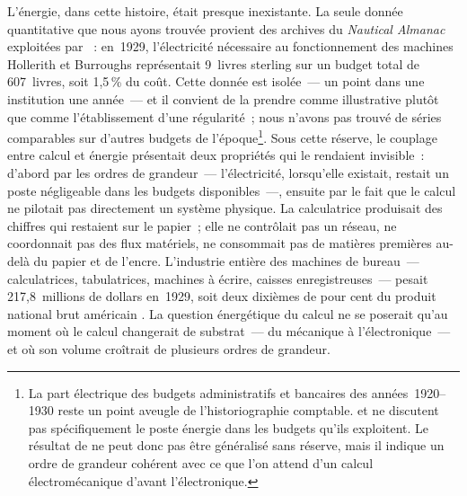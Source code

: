 L'énergie, dans cette histoire, était presque inexistante. La seule donnée quantitative que nous ayons trouvée provient des archives du \emph{Nautical Almanac} exploitées par \textcite{daston_calculation_2018}~: en~1929, l'électricité nécessaire au fonctionnement des machines Hollerith et Burroughs représentait 9~livres sterling sur un budget total de 607~livres, soit 1,5\,\% du coût. Cette donnée est isolée~--- un point dans une institution une année~--- et il convient de la prendre comme illustrative plutôt que comme l'établissement d'une régularité~; nous n'avons pas trouvé de séries comparables sur d'autres budgets de l'époque\footnote{La part électrique des budgets administratifs et bancaires des années~1920--1930 reste un point aveugle de l'historiographie comptable. \textcite{cortada_before_1993} et \textcite{wootton_making_2007} ne discutent pas spécifiquement le poste \og énergie\fg{} dans les budgets qu'ils exploitent. Le résultat de \textcite{daston_calculation_2018} ne peut donc pas être généralisé sans réserve, mais il indique un ordre de grandeur cohérent avec ce que l'on attend d'un calcul électromécanique d'avant l'électronique.}. %
Sous cette réserve, le couplage entre calcul et énergie présentait deux propriétés qui le rendaient invisible~: d'abord par les ordres de grandeur~--- l'électricité, lorsqu'elle existait, restait un poste négligeable dans les budgets disponibles~---, ensuite par le fait que le calcul ne pilotait pas directement un système physique. La calculatrice produisait des chiffres qui restaient sur le papier~; elle ne contrôlait pas un réseau, ne coordonnait pas des flux matériels, ne consommait pas de matières premières au-delà du papier et de l'encre. L'industrie entière des machines de bureau~--- calculatrices, tabulatrices, machines à écrire, caisses enregistreuses~--- pesait 217,8~millions de dollars en~1929, soit deux dixièmes de pour cent du produit national brut américain \parencite{cortada_before_1993}. La question énergétique du calcul ne se poserait qu'au moment où le calcul changerait de substrat~--- du mécanique à l'électronique~--- et où son volume croîtrait de plusieurs ordres de grandeur.



